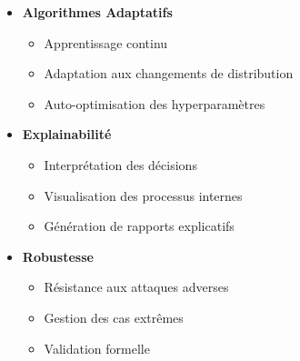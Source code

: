 \begin{itemize}
    \item \textbf{Algorithmes Adaptatifs}
    \begin{itemize}
        \item Apprentissage continu
        \item Adaptation aux changements de distribution
        \item Auto-optimisation des hyperparamètres
    \end{itemize}

    \item \textbf{Explainabilité}
    \begin{itemize}
        \item Interprétation des décisions
        \item Visualisation des processus internes
        \item Génération de rapports explicatifs
    \end{itemize}

    \item \textbf{Robustesse}
    \begin{itemize}
        \item Résistance aux attaques adverses
        \item Gestion des cas extrêmes
        \item Validation formelle
    \end{itemize}
\end{itemize}
